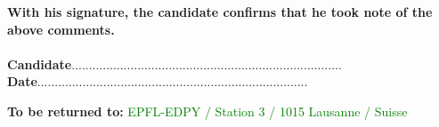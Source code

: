 \documentclass[11pt,titlepage]{article}
\begin{document}
\noindent \textbf{With his signature, the candidate confirms that he took note of the above comments.}\\\\

\noindent \textbf{Candidate}\hspace{7cm}..............................................................................\vspace{0.5cm}\\

\noindent \textbf{Date}\hspace{8.05cm}..............................................................................\\

\vspace{0.8cm}
\begin{center}
\textbf{To be returned to:} \textcolor{green}{EPFL-EDPY / Station 3 / 1015 Lausanne / Suisse}
\end{center}
\end{document}
